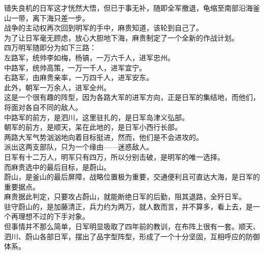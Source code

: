 \begin{multicols}{\theparacolNo}
错失良机的日军这才恍然大悟，但已于事无补，随即全军撤退，龟缩至南部沿海釜山一带，离下海只差一步。\\

战争的主动权再次回到明军的手中，麻贵知道，该轮到自己了。\\

为了让日军毫无顾虑，放心大胆地下海，麻贵制定了一个全新的作战计划。\\

四万明军随即分为如下三路：\\

左路军，统帅李如梅，杨镐，一万六千人，进军忠州。\\

中路军，统帅高策，一万一千人，进军宜宁。\\

右路军，由麻贵亲率，一万四千人，进军安东。\\

此外，朝军一万余人，进军全州。\\

这是一个很有趣的阵型，因为各路大军的进军方向，正是日军的集结地，而他们，将面对各自不同的敌人。\\

中路军的前方，是泗川，这里驻扎的，是日军岛津义弘部。\\

朝军的前方，是顺天，呆在此地的，是日军小西行长部。\\

两路大军气势汹汹地向着目标挺进，然而，他们是不会进攻的。\\

派出这两支部队，只为一个缘由——迷惑敌人。\\

日军有十二万人，明军只有四万，所以分别击破，是明军的唯一选择。\\

而麻贵选中的最后目标，是蔚山。\\

蔚山，是釜山的最后屏障，战略位置极为重要，交通便利且可直达大海，是日军的重要据点。\\

麻贵据此判定，只要攻占蔚山，就能断绝日军的后勤，阻其退路，全歼日军。\\

驻守蔚山的，是加藤清正，兵力约为两万，就人数而言，并不算多，看上去，是一个再理想不过的下手对象。\\

但事情并不那么简单，日军明显吸取了四年前的教训，在布阵上很有一套。顺天、泗川、蔚山各部日军，摆出了品字型阵型，形成了一个十分坚固，互相呼应的防御体系。\\


\end{multicols}
